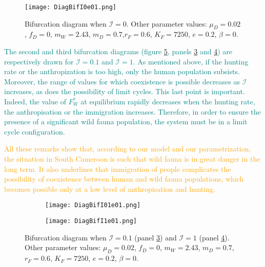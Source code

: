 \documentclass{article}
\newcommand{\lfw}{\lambda_{F}}
\newcommand{\lfw}{\lambda_{F}}
\newcommand{\cI}{\mathcal{I}}
\newcommand{\vdeux}[1]{\textcolor{orange}{#1}}
\newcommand{\vtrois}[1]{\textcolor{OliveGreen}{#1}}
\newcommand{\vquatre}[1]{\textcolor{teal}{#1}}
\theoremstyle{definition}
\theoremstyle{remark}
\begin{document}

\begin{figure}[!ht]
\centering
\texttt{[image: DiagBifI0e01.png]}
\caption{Bifurcation diagram when $\cI = 0$. Other parameter values: $\mu_D = 0.02$, $f_D = 0$, $m_W = 2.43$, $m_D = 0.7$,$r_F =0.6$, $K_F = 7250$, $e=0.2$, $\beta = 0$.}
\label{fig:bifurcation, I=0}
\end{figure}



\vquatre{
The second and third bifurcation diagrams (figure \ref{fig:bifurcation, I>0}, panels \ref{fig:bifurcation, I=0.1} and \ref{fig:bifurcation, I=1}) are respectively drawn for $\cI = 0.1$ and $\cI = 1$. As mentioned above, if the hunting rate or the anthropization is too high, only the human population subsists. Moreover, the range of values for which coexistence is possible decreases as $\cI$ increases, as does the possibility of limit cycles. This last point is important. Indeed, the value of $F_W^*$ at equilibrium rapidly decreases when the hunting rate, the anthropisation or the immigration increases. Therefore, in order to ensure the presence of a significant wild fauna population, the system must be in a limit cycle configuration.}

\vdeux{All these \vtrois{remarks} show that, according to our model and our parametrization, the situation in South Cameroon is such that wild fauna is in great danger in the long term. It also underlines that immigration of people complicates the possibility of coexistence between human and wild fauna populations, which becomes possible only at a low level of anthropisation and hunting.}

\begin{figure}[!ht]
\centering
\begin{subfigure}{1\textwidth}
\texttt{[image: DiagBifI01e01.png]}
\caption{}
\label{fig:bifurcation, I=0.1}
\end{subfigure}
\end{figure}
\begin{figure}
\ContinuedFloat
\begin{subfigure}{1\textwidth}
\centering
\texttt{[image: DiagBifI1e01.png]}
\caption{}
\label{fig:bifurcation, I=1}
\end{subfigure}
\caption{Bifurcation diagram when $\cI = 0.1$ (panel \ref{fig:bifurcation, I=0.1}) and $\cI = 1$ (panel \ref{fig:bifurcation, I=1}). Other parameter values: $\mu_D = 0.02$, $f_D = 0$, $m_W = 2.43$, $m_D = 0.7$,$r_F =0.6$, $K_F = 7250$, $e=0.2$, $\beta = 0$.}
\label{fig:bifurcation, I>0}
\end{figure}
\end{document}
